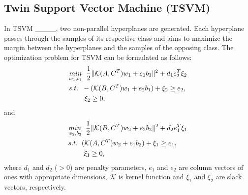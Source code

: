 \subsection{Twin Support Vector Machine (TSVM)}
In TSVM ____, two non-parallel hyperplanes are generated. Each hyperplane passes through the samples of its respective class and aims to maximize the margin between the hyperplanes and the samples of the opposing class. The optimization problem for TSVM can be formulated as follows:
\begin{align}
\label{eq:1}
      & \underset{w_1,b_1}{min} \hspace{0.2cm} \frac{1}{2} \|\mathcal{K}(A, C^T)w_1 + e_1b_1\|^2 + d_1e_2^T\xi_2 \nonumber \\
     & s.t. \hspace{0.2cm} -(\mathcal{K}(B, C^T)w_1 + e_2b_1) + \xi_2 \geq e_2, \nonumber \\
     & \hspace{0.8cm} \xi_2 \geq 0,
\end{align}
and
\begin{align}
\label{eq:2}
    & \underset{w_2,b_2}{min} \hspace{0.2cm} \frac{1}{2} \|\mathcal{K}(B, C^T)w_2 + e_2b_2\|^2 + d_2e_1^T\xi_1 \nonumber \\
     & s.t. \hspace{0.2cm} (\mathcal{K}(A, C^T)w_2 + e_1b_2) + \xi_1 \geq e_1, \nonumber \\
     & \hspace{0.8cm} \xi_1 \geq 0,
\end{align}
where \( d_1 \) and \( d_2 \) (\( > 0 \)) are penalty parameters, \( e_1 \) and \( e_2 \) are column vectors of ones with appropriate dimensions, $\mathcal{K}$ is kernel function and \( \xi_1 \) and \( \xi_2 \) are slack vectors, respectively. 

